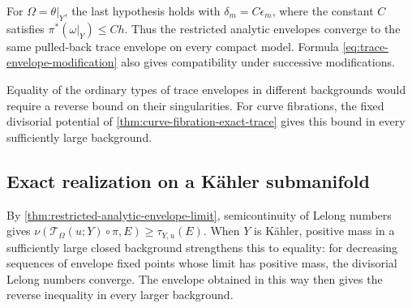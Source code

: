 For $\Omega=\theta|_Y$, the last hypothesis holds with $\delta_m=C\epsilon_m$, where the constant $C$ satisfies $\pi^*(\omega|_Y)\leq Ch$. Thus the restricted analytic envelopes converge to the same pulled-back trace envelope on every compact model. Formula \eqref{eq:trace-envelope-modification} also gives compatibility under successive modifications.

Equality of the ordinary types of trace envelopes in different backgrounds would require a reverse bound on their singularities. For curve fibrations, the fixed divisorial potential of \cref{thm:curve-fibration-exact-trace} gives this bound in every sufficiently large background.

\subsection{Exact realization on a K\"ahler submanifold}

By \cref{thm:restricted-analytic-envelope-limit}, semicontinuity of Lelong numbers gives $\nu(\mathcal T_\Omega(u;Y)\circ\pi,E)\geq\tau_{Y,u}(E)$. When $Y$ is K\"ahler, positive mass in a sufficiently large closed background strengthens this to equality: for decreasing sequences of envelope fixed points whose limit has positive mass, the divisorial Lelong numbers converge. The envelope obtained in this way then gives the reverse inequality in every larger background.

